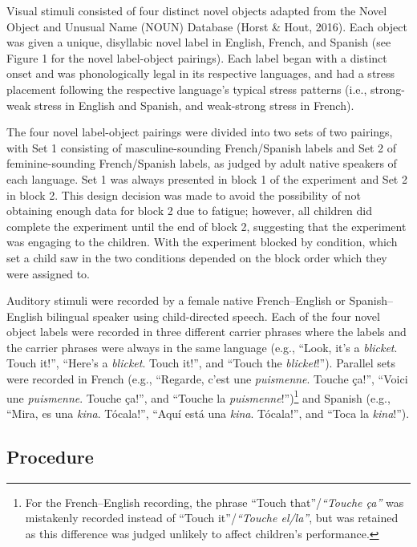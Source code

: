 \documentclass[
  man,floatsintext]{apa7}
\begin{document}
Visual stimuli consisted of four distinct novel objects adapted from the Novel Object and Unusual Name (NOUN) Database (Horst \& Hout, 2016). Each object was given a unique, disyllabic novel label in English, French, and Spanish (see Figure 1 for the novel label-object pairings). Each label began with a distinct onset and was phonologically legal in its respective languages, and had a stress placement following the respective language's typical stress patterns (i.e., strong-weak stress in English and Spanish, and weak-strong stress in French).

The four novel label-object pairings were divided into two sets of two pairings, with Set 1 consisting of masculine-sounding French/Spanish labels and Set 2 of feminine-sounding French/Spanish labels, as judged by adult native speakers of each language. Set 1 was always presented in block 1 of the experiment and Set 2 in block 2. This design decision was made to avoid the possibility of not obtaining enough data for block 2 due to fatigue; however, all children did complete the experiment until the end of block 2, suggesting that the experiment was engaging to the children. With the experiment blocked by condition, which set a child saw in the two conditions depended on the block order which they were assigned to.

Auditory stimuli were recorded by a female native French--English or Spanish--English bilingual speaker using child-directed speech. Each of the four novel object labels were recorded in three different carrier phrases where the labels and the carrier phrases were always in the same language (e.g., ``Look, it's a \emph{blicket}. Touch it!'', ``Here's a \emph{blicket}. Touch it!'', and ``Touch the \emph{blicket}!''). Parallel sets were recorded in French (e.g., ``Regarde, c'est une \emph{puismenne}. Touche ça!'', ``Voici une \emph{puismenne}. Touche ça!'', and ``Touche la \emph{puismenne}!'')\footnote{For the French--English recording, the phrase ``Touch that''/\emph{``Touche ça''} was mistakenly recorded instead of ``Touch it''/\emph{``Touche el/la''}, but was retained as this difference was judged unlikely to affect children's performance.} and Spanish (e.g., ``Mira, es una \emph{kina}. Tócala!'', ``Aquí está una \emph{kina}. Tócala!'', and ``Toca la \emph{kina}!'').

\hypertarget{procedure}{%
\subsection{Procedure}\label{procedure}}
\end{document}
